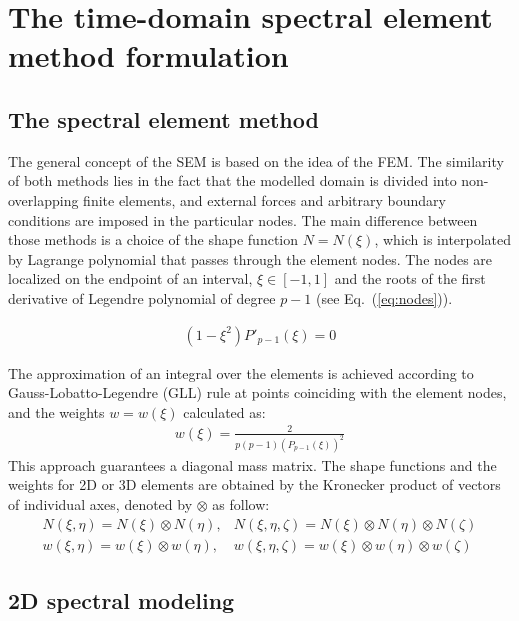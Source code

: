 \documentclass[materials,article,submit,moreauthors,pdftex]{Definitions/mdpi}
\begin{document}
\section{The time-domain spectral element method formulation}
\label{sec:time_SEM}
\subsection{The spectral element method}
\label{sec:sem}
The general concept of the SEM is based on the idea of the FEM.
The similarity of both methods lies in the fact that the modelled domain is divided into non-overlapping finite elements, and external forces and arbitrary boundary conditions are imposed in the particular nodes.
The main difference between those methods is a choice of the shape function \( N=N(\xi )\), which is interpolated by Lagrange polynomial that passes through the element nodes. The nodes are localized on the endpoint of an interval, \(\xi\in[-1,1]\) and the roots of the first derivative of Legendre polynomial of degree \(p-1\) (see Eq.~(\ref{eq:nodes})).

\begin{eqnarray}
(1-\xi^2)P'_{p-1}(\xi)=0
\label{eq:nodes}
\end{eqnarray}

The approximation of an integral over the elements is achieved according to Gauss-Lobatto-Legendre (GLL) rule at points coinciding with the element nodes, 
and the weights \(w=w(\xi)\) calculated as:
\begin{eqnarray}
{w(\xi)} = \frac{2}{p(p-1)(P_{p-1}(\xi))^2}
\label{eq:weights}
\end{eqnarray}
This approach guarantees a diagonal mass matrix.
The shape functions and the weights for 2D or 3D elements are obtained by the Kronecker product of vectors of individual axes, denoted by \(\otimes\) as follow:
\begin{eqnarray}
N(\xi,\eta) = N(\xi)\otimes N(\eta), & N(\xi,\eta,\zeta) = N(\xi)\otimes N(\eta)\otimes N(\zeta) \nonumber\\
w(\xi,\eta) = w(\xi)\otimes w(\eta), & w(\xi,\eta,\zeta) = w(\xi)\otimes w(\eta)\otimes w(\zeta) 
\label{eq:3Dshape_weights}
\end{eqnarray}
\subsection{2D spectral modeling}
\label{sec:2D_SEM}
\end{document}
